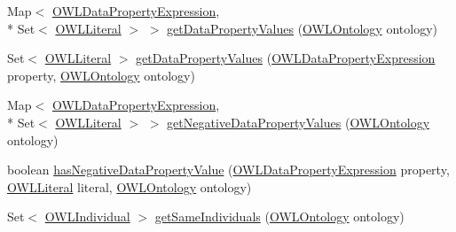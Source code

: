 \begin{DoxyCompactItemize}
\item 
Map$<$ \hyperlink{interfaceorg_1_1semanticweb_1_1owlapi_1_1model_1_1_o_w_l_data_property_expression}{O\-W\-L\-Data\-Property\-Expression}, \\*
Set$<$ \hyperlink{interfaceorg_1_1semanticweb_1_1owlapi_1_1model_1_1_o_w_l_literal}{O\-W\-L\-Literal} $>$ $>$ \hyperlink{interfaceorg_1_1semanticweb_1_1owlapi_1_1model_1_1_o_w_l_individual_a0843d6b53c929618631484a6e1f4d4aa}{get\-Data\-Property\-Values} (\hyperlink{interfaceorg_1_1semanticweb_1_1owlapi_1_1model_1_1_o_w_l_ontology}{O\-W\-L\-Ontology} ontology)
\item 
Set$<$ \hyperlink{interfaceorg_1_1semanticweb_1_1owlapi_1_1model_1_1_o_w_l_literal}{O\-W\-L\-Literal} $>$ \hyperlink{interfaceorg_1_1semanticweb_1_1owlapi_1_1model_1_1_o_w_l_individual_a927792e1ad4ac4c63dd95ec6904e07cb}{get\-Data\-Property\-Values} (\hyperlink{interfaceorg_1_1semanticweb_1_1owlapi_1_1model_1_1_o_w_l_data_property_expression}{O\-W\-L\-Data\-Property\-Expression} property, \hyperlink{interfaceorg_1_1semanticweb_1_1owlapi_1_1model_1_1_o_w_l_ontology}{O\-W\-L\-Ontology} ontology)
\item 
Map$<$ \hyperlink{interfaceorg_1_1semanticweb_1_1owlapi_1_1model_1_1_o_w_l_data_property_expression}{O\-W\-L\-Data\-Property\-Expression}, \\*
Set$<$ \hyperlink{interfaceorg_1_1semanticweb_1_1owlapi_1_1model_1_1_o_w_l_literal}{O\-W\-L\-Literal} $>$ $>$ \hyperlink{interfaceorg_1_1semanticweb_1_1owlapi_1_1model_1_1_o_w_l_individual_a7ea8022caaaf130852110fc06c7cb0c9}{get\-Negative\-Data\-Property\-Values} (\hyperlink{interfaceorg_1_1semanticweb_1_1owlapi_1_1model_1_1_o_w_l_ontology}{O\-W\-L\-Ontology} ontology)
\item 
boolean \hyperlink{interfaceorg_1_1semanticweb_1_1owlapi_1_1model_1_1_o_w_l_individual_a7d3347caa345a1d890a83905e66f5759}{has\-Negative\-Data\-Property\-Value} (\hyperlink{interfaceorg_1_1semanticweb_1_1owlapi_1_1model_1_1_o_w_l_data_property_expression}{O\-W\-L\-Data\-Property\-Expression} property, \hyperlink{interfaceorg_1_1semanticweb_1_1owlapi_1_1model_1_1_o_w_l_literal}{O\-W\-L\-Literal} literal, \hyperlink{interfaceorg_1_1semanticweb_1_1owlapi_1_1model_1_1_o_w_l_ontology}{O\-W\-L\-Ontology} ontology)
\item 
Set$<$ \hyperlink{interfaceorg_1_1semanticweb_1_1owlapi_1_1model_1_1_o_w_l_individual}{O\-W\-L\-Individual} $>$ \hyperlink{interfaceorg_1_1semanticweb_1_1owlapi_1_1model_1_1_o_w_l_individual_ad8e9fb9327791d24820400af378e0483}{get\-Same\-Individuals} (\hyperlink{interfaceorg_1_1semanticweb_1_1owlapi_1_1model_1_1_o_w_l_ontology}{O\-W\-L\-Ontology} ontology)

\end{DoxyCompactItemize}
